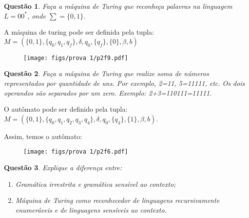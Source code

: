\documentclass{article}
\newtheorem{problem}{Questão}
\begin{document}
    \begin{problem}
         Faça a máquina de Turing que reconheça palavras na linguagem $L=00^*$, onde $\sum = \{0,1\}$. 
    \end{problem}
    
    \begin{solution}
        
        A máquina de turing pode ser definida pela tupla:\newline
        $M = (\{0, 1\}, \{q_0, q_1, q_f\}, \delta, q_0, \{q_f\}, \{0\}, \beta, b)$
        
        \begin{figure}[H]
             \centering
             \texttt{[image: figs/prova 1/p2f9.pdf]}
        \end{figure}
    \end{solution}
    
    \begin{problem}
        Faça a máquina de Turing que realize soma de números representados por quantidade de uns. Por exemplo, 2=11, 5=11111, etc. Os dois operandos são separados por um zero.
        Exemplo: 2+3=110111=11111.
    \end{problem}
    
    
    \begin{solution}
        O autômato pode ser definido pela tupla:\newline
        $M = (\{0, 1\}, \{q_0, q_1, q_2, q_3, q_4\}, \delta, q_0, \{q_4\}, \{1\}, \beta, b)$.
        
        Assim, temos o autômato:
        
        \begin{figure}[H]
             \centering
             \texttt{[image: figs/prova 1/p2f6.pdf]}
         \end{figure}
    \end{solution}
    
    \begin{problem}
         Explique a diferença entre:
            \begin{enumerate}[label=(\alph*)]
            \item Gramática irrestrita e gramática sensível ao contexto;
            \item Máquina de Turing como reconhecedor de linguagens recursivamente enumeráveis e de linguagens sensíveis ao contexto.
            \end{enumerate}
    \end{problem}
    
\end{document}
